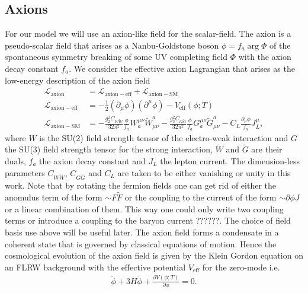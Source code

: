 \documentclass[13pt,a4paper,titlepage]{article}
\begin{document}
\subsection{Axions}
\label{sec:axions}

For our model we will use an axion-like field for the scalar-field.
The axion is a pseudo-scalar field that arises as a Nanbu-Goldstone boson $\phi = f_a \arg \Phi$ of the spontaneous symmetry breaking of some UV completing field $\Phi$ with the axion decay constant $f_a$.
We consider the effective axion Lagrangian that arises as the low-energy description of the axion field \cite[sec. 2.5]{Di_Luzio_2020_Landscape_of_QCD_Axion_models}
\begin{align}
    \mathcal{L}_{\mathrm{axion}} &= \mathcal{L}_{\mathrm{axion-eff}} + \mathcal{L}_{\mathrm{axion-SM}} \\
    \mathcal{L}_{\mathrm{axion-eff}} &= - \frac{1}{2} (\partial_\mu \phi) (\partial^\mu \phi) - V_\mathrm{eff}(\phi; T) \\
    \mathcal{L}_{\mathrm{axion-SM}} &=
        - \frac{g_2^2 C_{W\tilde{W}}}{32 \pi^2} \frac{\phi}{f_a} W_a^{\mu \nu}\tilde{W}^a_{\mu \nu}
        - \frac{g_3^2 C_{G\tilde{G}}}{32 \pi^2} \frac{\phi}{f_a} G_a^{\mu \nu}\tilde{G}^a_{\mu \nu}
        - C_{L} \frac{\partial_\mu \phi}{f_a} J^\mu_L,
\end{align}
where $W$ is the SU(2) field strength tensor of the electro-weak interaction and $G$ the SU(3) field strength tensor for the strong interaction, $\tilde{W}$ and $\tilde{G}$ are their duals, $f_a$ the axion decay constant and $J_L$ the lepton current.
The dimension-less parameters $C_{W\tilde{W}}$, $C_{G\tilde{G}}$ and $C_L$ are taken to be either vanishing or unity in this work.
Note that by rotating the fermion fields one can get rid of either the anomulus term of the form $\sim F \tilde{F}$ or the coupling to the current of the form $\sim \partial \phi J$
or a linear combination of them. This way one could only write two coupling terms or
introduce a coupling to the baryon current ??????. The choice of field basis use above will be useful later.
The axion field forms a condensate in a coherent state that is governed by classical
equations of motion. Hence the cosmological evolution of the axion field is given by
the Klein Gordon equation on an FLRW background \cite[chap. 1, 2]{the_early_universe_kolb_and_turner} with the effective potential $V_\mathrm{eff}$ for the zero-mode i.e. \cite[sec. 4.1, 4.2]{Axion_Cosmology_Marsh_2016}
\begin{align}
    \label{eq:axion_klein_gordon}
    \ddot{\phi} + 3 H \dot{\phi} + \frac{\partial V(\phi; T)}{\partial \phi} = 0.
\end{align}
\end{document}
